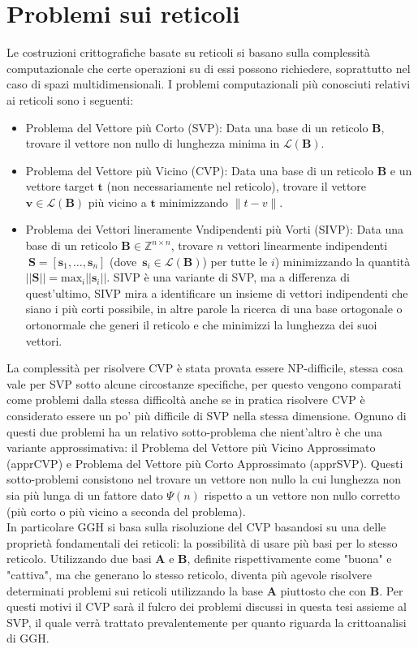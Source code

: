 \section{Problemi sui reticoli}
\label{problemi}
Le costruzioni crittografiche basate su reticoli si basano sulla complessità 
computazionale che certe operazioni su di essi possono richiedere, 
soprattutto nel caso di spazi multidimensionali. I problemi computazionali 
più conosciuti relativi ai reticoli sono i seguenti:
\begin{itemize}
    \item Problema del Vettore più Corto (SVP): Data una base di un reticolo $\mathbf{B}$, 
    trovare il vettore non nullo di lunghezza minima in $\mathcal{L}(\mathbf{B})$.
    \item Problema del Vettore più Vicino (CVP): Data una base di un reticolo $\mathbf{B}$ e un 
    vettore target $\mathbf{t}$ (non necessariamente nel reticolo), trovare il vettore 
    $\mathbf{v} \in \mathcal{L}(\mathbf{B})$ più vicino a $\mathbf{t}$ minimizzando 
    $\|t-v\|$.
    \item Problema dei Vettori lineramente Vndipendenti più Vorti (SIVP): Data una base di un reticolo 
    $\mathbf{B} \in \mathbb{Z}^{n\times n}$, trovare $n$ vettori linearmente indipendenti 
    $\ {\mathbf{S} = [\mathbf{s}_1, \dots, \mathbf{s}_n]}$ 
    \mbox{(dove  $\mathbf{s}_i \in \mathcal{L}(\mathbf{B})$)}
    per tutte le $i$) minimizzando la quantità 
    ${||\mathbf{S}|| = \text{max}_i||\mathbf{s}_i||}$. 
    SIVP è una variante di SVP, ma a differenza di quest'ultimo, SIVP mira a identificare 
    un insieme di vettori indipendenti che siano i più corti possibile, in altre parole 
    la ricerca di una base ortogonale o ortonormale che generi il reticolo e che minimizzi
     la lunghezza dei suoi vettori.
    \end{itemize}

La complessità per risolvere CVP è stata provata essere NP-difficile\cite{CVP-NP09}, stessa
cosa vale per SVP sotto alcune circostanze specifiche\cite{SVP-NP02}, per questo vengono
comparati come problemi dalla stessa difficoltà anche se in pratica risolvere CVP è considerato 
essere un po' più difficile di SVP nella stessa dimensione. 
Ognuno di questi due problemi ha un relativo sotto-problema che nient'altro è che una 
variante approssimativa: il Problema del Vettore più Vicino Approssimato (apprCVP) 
e Problema del Vettore più Corto Approssimato  (apprSVP). Questi sotto-problemi consistono nel 
trovare un vettore non nullo la cui lunghezza non sia più lunga di un fattore dato $\Psi(n)$
rispetto a un vettore non nullo corretto (più corto o più vicino a seconda del problema).
\\
In particolare GGH si basa sulla risoluzione del CVP basandosi su una delle proprietà
fondamentali dei reticoli: la possibilità di usare più basi per lo stesso reticolo.
Utilizzando due basi $\mathbf{A}$ e $\mathbf{B}$, definite rispettivamente come 
"buona" e "cattiva", ma che generano lo stesso reticolo, diventa più agevole 
risolvere determinati problemi sui reticoli utilizzando la base $\mathbf{A}$ piuttosto 
che con $\mathbf{B}$. 
Per questi motivi il CVP sarà il fulcro dei problemi discussi in questa tesi assieme al SVP,
il quale verrà trattato prevalentemente per quanto riguarda la crittoanalisi di GGH. 